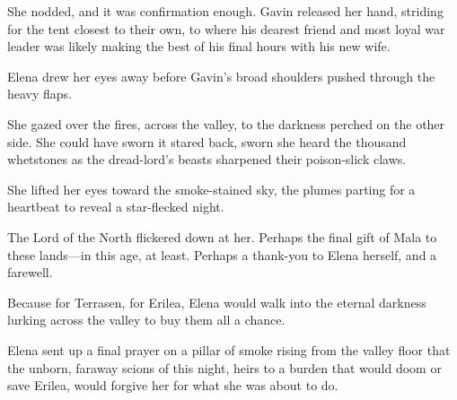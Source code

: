 She nodded, and it was confirmation enough.
Gavin released her hand, striding for the tent closest to their own, to where his dearest friend and most loyal war leader was likely making the best of his final hours with his new wife.

Elena drew her eyes away before Gavin's broad shoulders pushed through the heavy flaps.

She gazed over the fires, across the valley, to the darkness perched on the other side.
She could have sworn it stared back, sworn she heard the thousand whetstones as the dread-lord's beasts sharpened their poison-slick claws.

She lifted her eyes toward the smoke-stained sky, the plumes parting for a heartbeat to reveal a star-flecked night.

The Lord of the North flickered down at her.
Perhaps the final gift of Mala to these lands---in this age, at least.
Perhaps a thank-you to Elena herself, and a farewell.

Because for Terrasen, for Erilea, Elena would walk into the eternal darkness lurking across the valley to buy them all a chance.

Elena sent up a final prayer on a pillar of smoke rising from the valley floor that the unborn, faraway scions of this night, heirs to a burden that would doom or save Erilea, would forgive her for what she was about to do.
